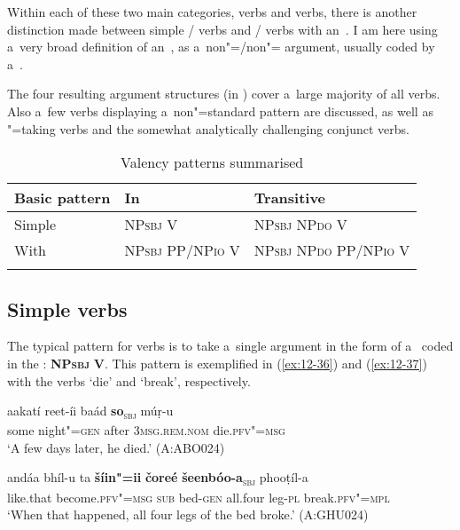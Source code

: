Within each of these two main categories,  verbs and  verbs, there is another distinction made between simple / verbs and / verbs with an~. I am here using a~very broad definition of an~, as a~non"=/non"= argument, usually coded by a~. 


The four resulting argument structures (in ) cover a~large majority of all verbs. Also a~few verbs displaying a~non"=standard pattern are discussed, as well as "=taking verbs and the somewhat analytically challenging conjunct verbs.


\begin{table}[ht]
\caption{Valency patterns summarised}

\begin{tabularx}{\textwidth}{ Q Q Q }
\lsptoprule
Basic pattern &
In &
Transitive\\\midrule
Simple &
NP\textsc{sbj} V &
NP\textsc{sbj} NP\textsc{do} V\\
With  &
NP\textsc{sbj} PP/NP\textsc{io} V &
NP\textsc{sbj} NP\textsc{do} PP/NP\textsc{io} V\\\lspbottomrule
\end{tabularx}
\label{tab:12-2}
\end{table}


\subsection{Simple  verbs}
\label{subsec:12-2-2}


The typical pattern for  verbs is to take a~single argument in the form of a~   coded in the : \textbf{NP\textsc{sbj}} \textbf{V}. This pattern is exemplified in (\ref{ex:12-36}) and (\ref{ex:12-37}) with the verbs `die' and `break', respectively.

\begin{exe}
\ex
\label{ex:12-36}
\gll aakatí reet-íi baád {\ob}\textbf{so}{\cb}\textsubscript{\textsc{\upshape sbj}} múṛ-u \\
some night"=\textsc{gen} after \textsc{3msg.rem.nom} die.\textsc{pfv"=msg} \\
\glt `A few days later, he died.' (A:ABO024)
\end{exe}
\begin{exe}
\ex
\label{ex:12-37}
\gll andáa bhíl-u ta {\ob}\textbf{šíin"=ii} \textbf{čoreé} \textbf{šeenbóo-a}{\cb}\textsubscript{\textsc{\upshape sbj}} phooṭíl-a\\
like.that become.\textsc{pfv"=msg} \textsc{sub} bed-\textsc{gen} all.four leg-\textsc{pl}  break.\textsc{pfv"=mpl}\\
\glt `When that happened, all four legs of the bed broke.' (A:GHU024)
\end{exe}


